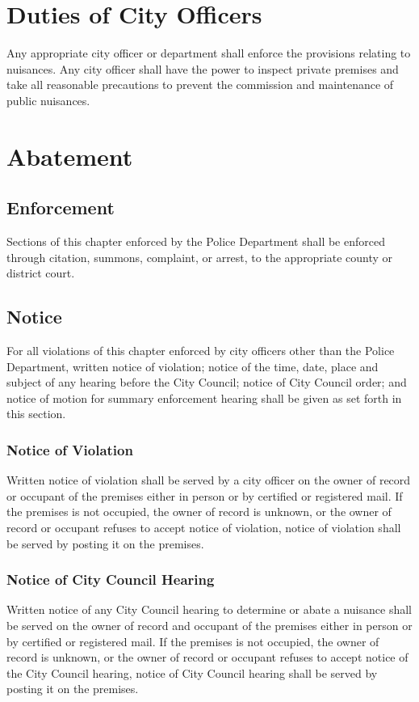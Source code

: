 \section{Duties of City Officers}
Any appropriate city officer or department shall enforce the provisions relating to nuisances.  Any city officer shall have the power to inspect private premises and take all reasonable precautions to prevent the commission and maintenance of public nuisances.
\section{Abatement}
\subsection{Enforcement}
Sections of this chapter enforced by the Police Department shall be enforced through citation, summons, complaint, or arrest, to the appropriate county or district court.
\subsection{Notice}
For all violations of this chapter enforced by city officers other than the Police Department, written notice of violation; notice of the time, date, place and subject of any hearing before the City Council; notice of City Council order; and notice of motion for summary enforcement hearing shall be given as set forth in this section.
\subsubsection{Notice of Violation}
Written notice of violation shall be served by a city officer on the owner of record or occupant of the premises either in person or by certified or registered mail.  If the premises is not occupied, the owner of record is unknown, or the owner of record or occupant refuses to accept notice of violation, notice of violation shall be served by posting it on the premises.
\subsubsection{Notice of City Council Hearing}
Written notice of any City Council hearing to determine or abate a nuisance shall be served on the owner of record and occupant of the premises either in person or by certified or registered mail.  If the premises is not occupied, the owner of record is unknown, or the owner of record or occupant refuses to accept notice of the City Council hearing, notice of City Council hearing shall be served by posting it on the premises.

